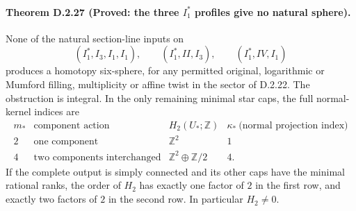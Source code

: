 \paragraph{Theorem D.2.27 (Proved: the three $I_1^*$ profiles give no natural sphere).}
None of the natural section-line inputs on
\[
 (I_1^*,I_3,I_1,I_1),\qquad (I_1^*,II,I_3),\qquad
 (I_1^*,IV,I_1)
\]
produces a homotopy six-sphere, for any permitted original,
logarithmic or Mumford filling, multiplicity or affine twist in
the sector of D.2.22. The obstruction is integral. In the only
remaining minimal star caps, the full normal-kernel indices are
\[
\begin{array}{c|c|c|c}
 m_*&\text{component action}&H_2(U_*;\mathbb Z)
       &\kappa_*\ \text{(normal projection index)}\\\hline
 2&\text{one component}&\mathbb Z^2&1\\
 4&\text{two components interchanged}&
                   \mathbb Z^2\oplus\mathbb Z/2&4.
\end{array}                                                   \tag{D.ST1}
\]
If the complete output is simply connected and its other caps
have the minimal rational ranks, the order of $H_2$ has exactly
one factor of $2$ in the first row, and exactly two factors of $2$
in the second row. In particular $H_2\ne0$.

